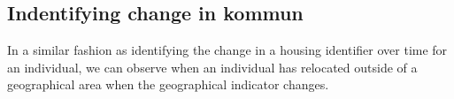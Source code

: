 \documentclass[
]{book}
\begin{document}
\hypertarget{indentifying-change-in-kommun}{%
\subsection{Indentifying change in kommun}\label{indentifying-change-in-kommun}}

In a similar fashion as identifying the change in a housing identifier over time for an individual, we can observe when an individual has relocated outside of a geographical area when the geographical indicator changes.
\end{document}
